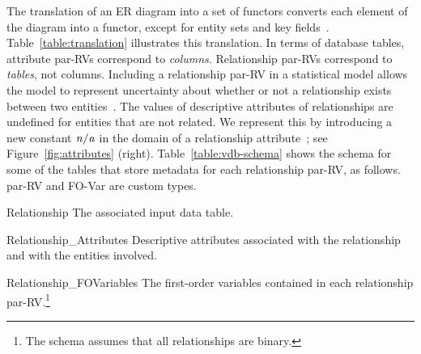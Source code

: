 \documentclass{IEEEtran}
\begin{document}
The translation of an ER diagram into a set of functors converts each element of the diagram into a functor, except for entity sets and key fields~\cite{Heckerman+al:SRL07}. Table~\ref{table:translation} illustrates this translation. In terms of database tables, attribute par-RVs correspond to {\em columns}. Relationship par-RVs correspond to {\em tables}, not columns. Including a relationship par-RV in a statistical model allows the model to represent uncertainty about whether or not a relationship exists between two entities~\cite{Kimmig2015}. The values of descriptive attributes of relationships are undefined for entities that are not related. We represent this by introducing a new constant $\it{n/a}$ in the domain of a relationship attribute~\cite{Milch2005}; see Figure~\ref{fig:attributes} (right). Table~\ref{table:vdb-schema} shows the schema for some of the tables that store metadata for 
each relationship par-RV, as follows. par-RV and FO-Var are custom types.

\begin{LaTeXdescription}
\item[Relationship] The associated input data table.
\item[Relationship\_Attributes] Descriptive attributes associated with the relationship and with the entities involved.
\item[Relationship\_FOVariables] The first-order variables contained in each relationship par-RV.\footnote{The schema assumes that all relationships are binary.}
\end{LaTeXdescription}

\end{document}
